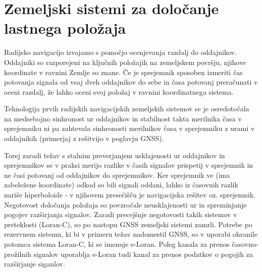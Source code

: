 %
\chapter{Zemeljski sistemi za določanje lastnega položaja}
\label{Ch:LastPolZem} %

Radijsko navigacijo izvajamo s pomočjo ocenjevanja razdalj do oddajnikov. Oddajniki so razporejeni na ključnih položajih na zemeljskem površju, njihove koordinate v ravnini Zemlje so znane. Če je sprejemnik sposoben izmeriti čas potovanja signala od vsaj dveh oddajnikov do sebe in časa potovanj preračunati v oceni razdalj, že lahko oceni svoj položaj v ravnini koordinatnega sistema. 

Tehnologija prvih radijskih navigacijskih zemeljskih sistemov se je osredotočala na medsebojno sinhronost ur oddajnikov in stabilnost takta merilnika časa v sprejemniku ni pa zahtevala sinhronosti merilnikov časa v sprejemniku z urami v oddajnikih (primerjaj z rešitvijo v poglavju GNSS). 

Torej zaradi težav s stalnim preverjanjem usklajenosti ur oddajnikov in sprejemnikov se v praksi merijo razlike v časih signalov prispetij v sprejemnik in ne časi potovanj od oddajnikov do sprejemnikov. Ker sprejemnik ve (ima zabeležene koordinate) odkod so bili signali oddani, lahko iz časovnih razlik nariše hiperboloide - v njihovem presečišču je navigacijska rešitev oz. sprejemnik. Negotovost določanja položaja so povzročale neusklajenosti ur in spreminjanje pogojev razširjanja signalov. Zaradi precejšnje negotovosti takih sistemov v preteklosti (Loran-C), so po nastopu GNSS zemeljski sistemi zamrli. Potrebe po rezervnem sistemu, ki bi v primeru težav nadomestil GNSS, so v uporabi ohranile potomca sistema Loran-C, ki se imenuje e-Loran. Poleg kanala za prenos časovno-prožilnih signalov uporablja e-Loran tudi kanal za prenos podatkov o pogojih za razširjanje siganlov.    


